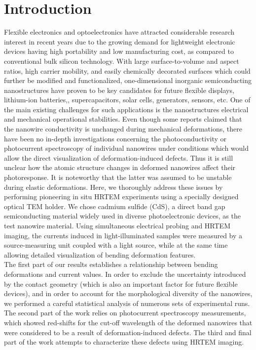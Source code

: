 \section{Introduction}
Flexible electronics and optoelectronics have attracted considerable research interest in recent years due to the growing demand for lightweight electronic devices having high portability and low manufacturing cost, as compared to conventional bulk silicon technology.\cite{Boland2010,Liu2015,Long2012} With large surface-to-volume and aspect ratios, high carrier mobility, and easily chemically decorated surfaces which could further be modified and functionalized, one-dimensional inorganic semiconducting nanostructures have proven to be key candidates for future flexible displays,\cite{Klauk2008} lithium-ion batteries,\cite{Wang2015}, supercapacitors,\cite{Li2014} solar cells,\cite{Zhang2012} generators,\cite{Fan2012} sensors,\cite{Zhang2014c} etc. One of the main existing challenges for such applications is the nanostructures electrical and mechanical operational stabilities. Even though some reports claimed that the nanowire conductivity is unchanged during mechanical deformations, there have been no in-depth investigations concerning the photoconductivity or photocurrent spectroscopy of individual nanowires under conditions which would allow the direct visualization of deformation-induced defects. Thus it is still unclear how the atomic structure changes in deformed nanowires affect their photoresponse. It is noteworthy that the latter was assumed to be unstable during elastic deformations.\cite{Antsov2014}
Here, we thoroughly address these issues by performing pioneering in situ HRTEM experiments using a specially designed optical TEM holder. We chose cadmium sulfide (CdS), a direct band gap semiconducting material widely used in diverse photoelectronic devices, as the test nanowire material.\cite{Xing2015} Using simultaneous electrical probing and HRTEM imaging, the currents induced in light-illuminated samples were measured by a source-measuring unit coupled with a light source, while at the same time allowing detailed visualization of bending deformation features. \\
The first part of our results establishes a relationship between bending deformations and current values. In order to exclude the uncertainty introduced by the contact geometry (which is also an important factor for future flexible devices), and in order to account for the morphological diversity of the nanowires, we performed a careful statistical analysis of numerous sets of experimental runs. The second part of the work relies on photocurrent spectroscopy measurements, which showed red-shifts for the cut-off wavelength of the deformed nanowires that were considered to be a result of deformation-induced defects. The third and final part of the work attempts to characterize these defects using HRTEM imaging. 

